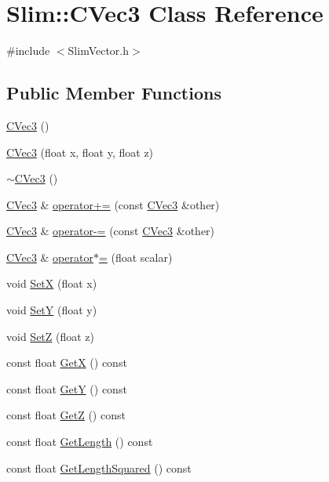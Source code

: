 \hypertarget{class_slim_1_1_c_vec3}{}\section{Slim\+:\+:C\+Vec3 Class Reference}
\label{class_slim_1_1_c_vec3}


{\ttfamily \#include $<$Slim\+Vector.\+h$>$}

\subsection*{Public Member Functions}
\begin{DoxyCompactItemize}
\item 
\hyperlink{class_slim_1_1_c_vec3_a308577f2a2e4a875f51a6915b29fcc1f}{C\+Vec3} ()
\item 
\hyperlink{class_slim_1_1_c_vec3_ad4382ac4d78571a3dd905f4a23495d69}{C\+Vec3} (float x, float y, float z)
\item 
\hyperlink{class_slim_1_1_c_vec3_ab045a20414688b2fd146b0b1183b7ccd}{$\sim$\+C\+Vec3} ()
\item 
\hyperlink{class_slim_1_1_c_vec3}{C\+Vec3} \& \hyperlink{class_slim_1_1_c_vec3_adc6f500d3b03f8db64a1c915bafe80a6}{operator+=} (const \hyperlink{class_slim_1_1_c_vec3}{C\+Vec3} \&other)
\item 
\hyperlink{class_slim_1_1_c_vec3}{C\+Vec3} \& \hyperlink{class_slim_1_1_c_vec3_a8f7ce4d4b218f8d17364903d3440f6b6}{operator-\/=} (const \hyperlink{class_slim_1_1_c_vec3}{C\+Vec3} \&other)
\item 
\hyperlink{class_slim_1_1_c_vec3}{C\+Vec3} \& \hyperlink{class_slim_1_1_c_vec3_a21e01a0cb170073b4a794a2f39a72094}{operator$\ast$=} (float scalar)
\item 
void \hyperlink{class_slim_1_1_c_vec3_aebd1660718ec25e6cfd2517b7d52337a}{Set\+X} (float x)
\item 
void \hyperlink{class_slim_1_1_c_vec3_a5f07dff030d0e45c4c3994e5c77dbadd}{Set\+Y} (float y)
\item 
void \hyperlink{class_slim_1_1_c_vec3_a7237ddcbff3e0efd80a904430c2cf762}{Set\+Z} (float z)
\item 
const float \hyperlink{class_slim_1_1_c_vec3_a9aeddb5397e2e762bb357997dd5a23ab}{Get\+X} () const 
\item 
const float \hyperlink{class_slim_1_1_c_vec3_a344c1bce73b4548eabbe8d55617e866b}{Get\+Y} () const 
\item 
const float \hyperlink{class_slim_1_1_c_vec3_a1616feaae34983c2ca0df1c5576f7fa1}{Get\+Z} () const 
\item 
const float \hyperlink{class_slim_1_1_c_vec3_ad256ed1179cca153130f20ce467513f9}{Get\+Length} () const 
\item 
const float \hyperlink{class_slim_1_1_c_vec3_a410d048426977c01a25bb4eea97f035d}{Get\+Length\+Squared} () const 
\end{DoxyCompactItemize}


